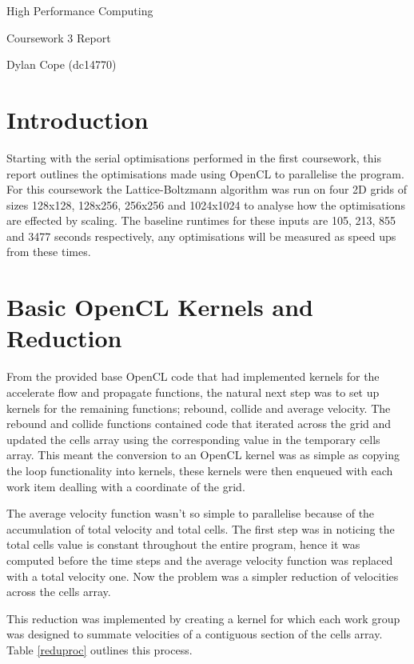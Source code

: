 \documentclass[12pt, a4paper]{article}
\begin{document}
  \vspace{.1in}
	\begin{center}
	{ \Large High Performance Computing }

  \end{center}
  \begin{center}

  Coursework 3 Report

	Dylan Cope (dc14770)

	\vspace{.1in}

	\end{center}

  \section*{Introduction}

  Starting with the serial optimisations performed in the first coursework, this report outlines the optimisations made using OpenCL to parallelise the program. For this coursework the Lattice-Boltzmann algorithm was run on four 2D grids of sizes 128x128, 128x256, 256x256 and 1024x1024 to analyse how the optimisations are effected by scaling. The baseline runtimes for these inputs are 105, 213, 855 and 3477 seconds respectively, any optimisations will be measured as speed ups from these times.

  \section*{Basic OpenCL Kernels and Reduction}

  \begin{multicols}{2}

    From the provided base OpenCL code that had implemented kernels for the accelerate flow and propagate functions, the natural next step was to set up kernels for the remaining functions; rebound, collide and average velocity. The rebound and collide functions contained code that iterated across the grid and updated the cells array using the corresponding value in the temporary cells array. This meant the conversion to an OpenCL kernel was as simple as copying the loop functionality into kernels, these kernels were then enqueued with each work item dealling with a coordinate of the grid.

    The average velocity function wasn't so simple to parallelise because of the accumulation of total velocity and total cells. The first step was in noticing the total cells value is constant throughout the entire program, hence it was computed before the time steps and the average velocity function was replaced with a total velocity one. Now the problem was a simpler reduction of velocities across the cells array.

    This reduction was implemented by creating a kernel for which each work group was designed to summate velocities of a contiguous section of the cells array. Table \ref{reduproc} outlines this process.
  \end{multicols}
\end{document}
